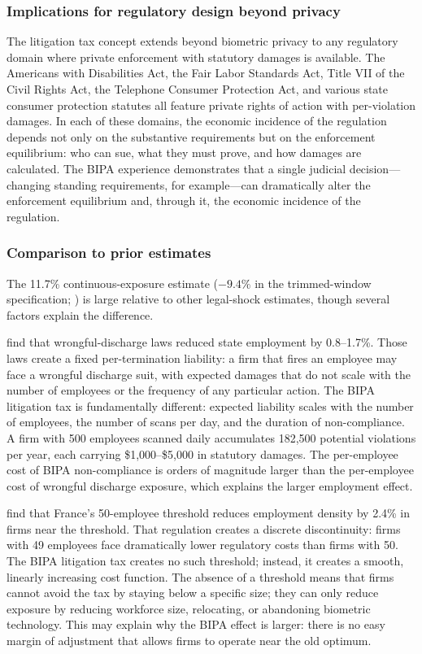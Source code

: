 \documentclass[12pt]{article}
\begin{document}
\subsubsection*{Implications for regulatory design beyond privacy} The litigation tax concept extends beyond biometric privacy to any regulatory domain where private enforcement with statutory damages is available. The Americans with Disabilities Act, the Fair Labor Standards Act, Title VII of the Civil Rights Act, the Telephone Consumer Protection Act, and various state consumer protection statutes all feature private rights of action with per-violation damages. In each of these domains, the economic incidence of the regulation depends not only on the substantive requirements but on the enforcement equilibrium: who can sue, what they must prove, and how damages are calculated. The BIPA experience demonstrates that a single judicial decision---changing standing requirements, for example---can dramatically alter the enforcement equilibrium and, through it, the economic incidence of the regulation.

\subsubsection*{Comparison to prior estimates} The 11.7\% continuous-exposure estimate ($-9.4\%$ in the trimmed-window specification; ) is large relative to other legal-shock estimates, though several factors explain the difference.

\citet{autordsh2006} find that wrongful-discharge laws reduced state employment by 0.8--1.7\%. Those laws create a fixed per-termination liability: a firm that fires an employee may face a wrongful discharge suit, with expected damages that do not scale with the number of employees or the frequency of any particular action. The BIPA litigation tax is fundamentally different: expected liability scales with the number of employees, the number of scans per day, and the duration of non-compliance. A firm with 500 employees scanned daily accumulates 182,500 potential violations per year, each carrying \$1,000--\$5,000 in statutory damages. The per-employee cost of BIPA non-compliance is orders of magnitude larger than the per-employee cost of wrongful discharge exposure, which explains the larger employment effect.

\citet{garicano2016} find that France's 50-employee threshold reduces employment density by 2.4\% in firms near the threshold. That regulation creates a discrete discontinuity: firms with 49 employees face dramatically lower regulatory costs than firms with 50. The BIPA litigation tax creates no such threshold; instead, it creates a smooth, linearly increasing cost function. The absence of a threshold means that firms cannot avoid the tax by staying below a specific size; they can only reduce exposure by reducing workforce size, relocating, or abandoning biometric technology. This may explain why the BIPA effect is larger: there is no easy margin of adjustment that allows firms to operate near the old optimum.
\end{document}
